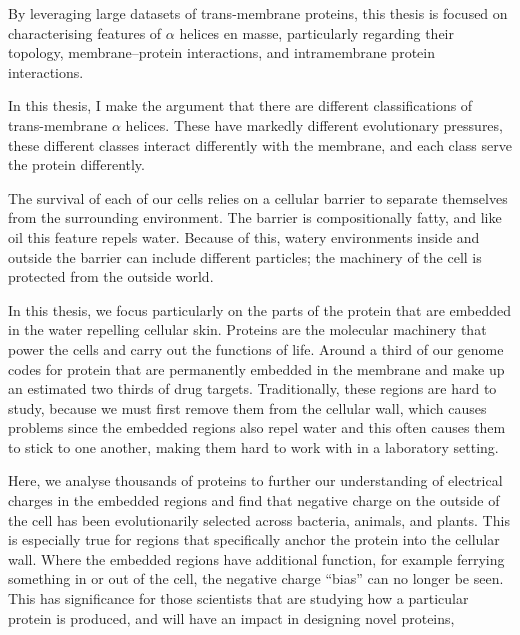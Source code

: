 \documentclass[12pt,PhD,twoside]{muthesis}
\begin{document}
By leveraging large datasets of trans-membrane proteins, this thesis is focused on characterising features of \(\alpha\) helices en masse, particularly regarding their topology, membrane\---protein interactions, and intramembrane protein interactions.

In this thesis, I make the argument that there are different classifications of trans-membrane \(\alpha\) helices. These have markedly different evolutionary pressures, these different classes interact differently with the membrane, and each class serve the protein differently.


The survival of each of our cells relies on a cellular barrier to separate themselves from the surrounding environment. The barrier is compositionally fatty, and like oil this feature repels water. Because of this, watery environments inside and outside the barrier can include different particles; the machinery of the cell is protected from the outside world.

In this thesis, we focus particularly on the parts of the protein that are embedded in the water repelling cellular skin. Proteins are the molecular machinery that power the cells and carry out the functions of life. Around a third of our genome codes for protein that are permanently embedded in the membrane and make up an estimated two thirds of drug targets. Traditionally, these regions are hard to study, because we must first remove them from the cellular wall, which causes problems since the embedded regions also repel water and this often causes them to stick to one another, making them hard to work with in a laboratory setting.

Here, we analyse thousands of proteins to further our understanding of electrical charges in the embedded regions and find that negative charge on the outside of the cell has been evolutionarily selected across bacteria, animals, and plants. This is especially true for regions that specifically anchor the protein into the cellular wall. Where the embedded regions have additional function, for example ferrying something in or out of the cell, the negative charge ``bias'' can no longer be seen. This has significance for those scientists that are studying how a particular protein is produced, and will have an impact in designing novel proteins,



\afterabstract{} %
\end{document}
